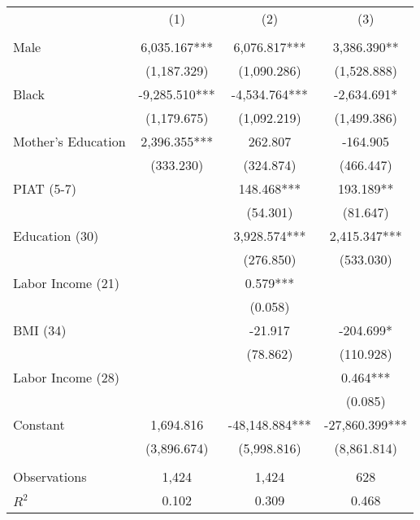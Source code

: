 \begin{tabular}{lccc} \toprule
 & (1) & (2) & (3) \\ \\ \midrule
Male & 6,035.167*** & 6,076.817*** & 3,386.390** \\
 & (1,187.329) & (1,090.286) & (1,528.888) \\
Black & -9,285.510*** & -4,534.764*** & -2,634.691* \\
 & (1,179.675) & (1,092.219) & (1,499.386) \\
Mother's Education & 2,396.355*** & 262.807 & -164.905 \\
 & (333.230) & (324.874) & (466.447) \\
PIAT (5-7)&  & 148.468*** & 193.189** \\
 &  & (54.301) & (81.647) \\
Education (30) &  & 3,928.574*** & 2,415.347*** \\
 &  & (276.850) & (533.030) \\
Labor Income (21) &  & 0.579*** &  \\
 &  & (0.058) &  \\
BMI (34) &  & -21.917 & -204.699* \\
 &  & (78.862) & (110.928) \\
Labor Income (28) &  &  & 0.464*** \\
 &  &  & (0.085) \\
Constant & 1,694.816 & -48,148.884*** & -27,860.399*** \\
 & (3,896.674) & (5,998.816) & (8,861.814) \\ \\ \midrule 
 Observations & 1,424 & 1,424 & 628 \\
$R^2$ & 0.102 & 0.309 & 0.468 \\ \bottomrule
\end{tabular}
